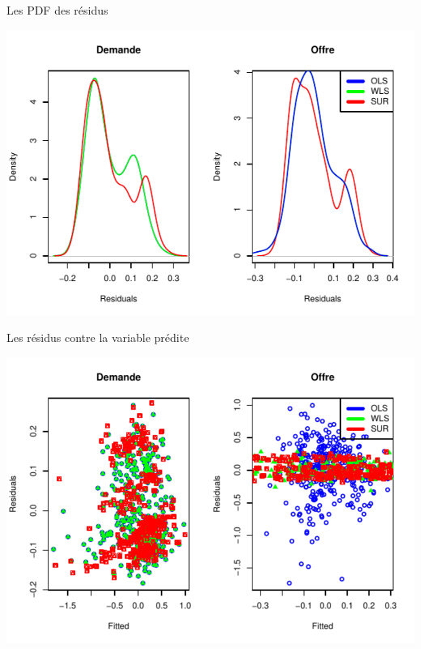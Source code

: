 \documentclass[11pt,ignorenonframetext,]{beamer}
\begin{document}
\begin{frame}{Les PDF des résidus}
\protect\hypertarget{les-pdf-des-residus}{}

\includegraphics{Presentation_files/figure-beamer/unnamed-chunk-46-1.pdf}

\end{frame}

\begin{frame}{Les résidus contre la variable prédite}
\protect\hypertarget{les-residus-contre-la-variable-predite}{}

\includegraphics{Presentation_files/figure-beamer/unnamed-chunk-47-1.pdf}

\end{frame}
\end{document}
